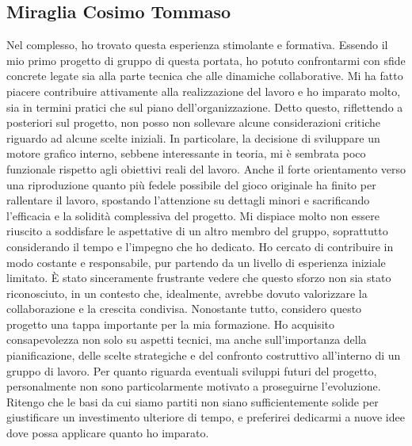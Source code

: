 \documentclass[a4paper,12pt]{report}
\begin{document}
{{\subsection{Miraglia Cosimo Tommaso}
Nel complesso, ho trovato questa esperienza stimolante e formativa. Essendo il mio primo progetto di gruppo di questa portata, ho potuto confrontarmi con sfide concrete legate sia alla parte tecnica che alle dinamiche collaborative. Mi ha fatto piacere contribuire attivamente alla realizzazione del lavoro e ho imparato molto, sia in termini pratici che sul piano dell’organizzazione.
Detto questo, riflettendo a posteriori sul progetto, non posso non sollevare alcune considerazioni critiche riguardo ad alcune scelte iniziali. In particolare, la decisione di sviluppare un motore grafico interno, sebbene interessante in teoria, mi è sembrata poco funzionale rispetto agli obiettivi reali del lavoro. Anche il forte orientamento verso una riproduzione quanto più fedele possibile del gioco originale ha finito per rallentare il lavoro, spostando l’attenzione su dettagli minori e sacrificando l’efficacia e la solidità complessiva del progetto.
Mi dispiace molto non essere riuscito a soddisfare le aspettative di un altro membro del gruppo, soprattutto considerando il tempo e l’impegno che ho dedicato. Ho cercato di contribuire in modo costante e responsabile, pur partendo da un livello di esperienza iniziale limitato. È stato sinceramente frustrante vedere che questo sforzo non sia stato riconosciuto, in un contesto che, idealmente, avrebbe dovuto valorizzare la collaborazione e la crescita condivisa.
Nonostante tutto, considero questo progetto una tappa importante per la mia formazione. Ho acquisito consapevolezza non solo su aspetti tecnici, ma anche sull’importanza della pianificazione, delle scelte strategiche e del confronto costruttivo all’interno di un gruppo di lavoro.
Per quanto riguarda eventuali sviluppi futuri del progetto, personalmente non sono particolarmente motivato a proseguirne l’evoluzione. Ritengo che le basi da cui siamo partiti non siano sufficientemente solide per giustificare un investimento ulteriore di tempo, e preferirei dedicarmi a nuove idee dove possa applicare quanto ho imparato.

}}
\end{document}

